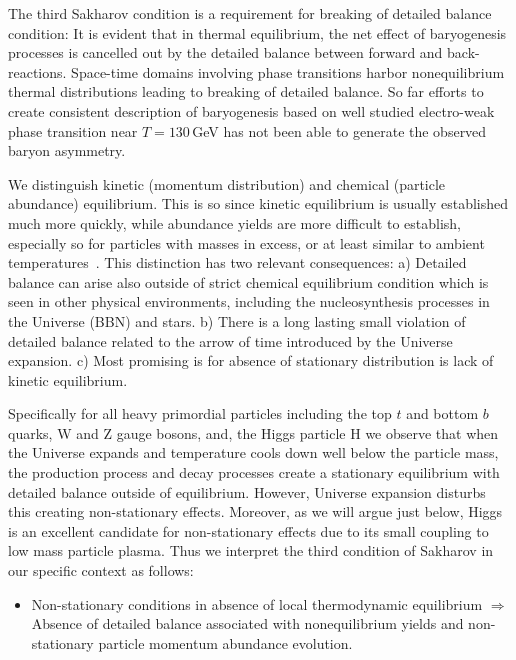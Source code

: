 The third Sakharov condition is a requirement for breaking of detailed balance condition: It is evident that in thermal equilibrium, the net effect of baryogenesis processes is cancelled out by the detailed balance between forward and back-reactions. Space-time domains involving phase transitions harbor nonequilibrium thermal distributions leading to breaking of detailed balance. So far efforts to create consistent description of baryogenesis based on well studied electro-weak phase transition near $T=130$\,GeV has not been able to generate the observed baryon asymmetry. 

We distinguish kinetic (momentum distribution) and chemical (particle abundance) equilibrium. This is so since kinetic equilibrium is usually established much more quickly, while abundance yields are more difficult to establish, especially so for particles with masses in excess, or at least similar to ambient temperatures~\cite{Koch:1986ud,Birrell:2014gea}. This distinction has two relevant consequences: a) Detailed balance can arise also outside of strict chemical equilibrium condition which is seen in other physical environments, including the nucleosynthesis processes in the Universe (BBN) and stars. b) There is a long lasting small violation of detailed balance related to the arrow of time introduced by the Universe expansion. c) Most promising is for absence of stationary distribution is lack of kinetic equilibrium. 

Specifically for all heavy primordial particles including the top $t$ and bottom $b$ quarks, W and Z gauge bosons, and, the Higgs particle H we observe that when the Universe expands and temperature cools down well below the particle mass, the production process and decay processes create a stationary equilibrium with detailed balance outside of equilibrium. However, Universe expansion disturbs this creating non-stationary effects. Moreover, as we will argue just below, Higgs is an excellent candidate for non-stationary effects due to its small coupling to low mass particle plasma. Thus we interpret the third condition of Sakharov in our specific context as follows:
\begin{itemize}
\item Non-stationary conditions in absence of local thermodynamic equilibrium $\Longrightarrow$ Absence of detailed balance associated with nonequilibrium yields and non-stationary particle momentum abundance evolution.
\end{itemize} 


